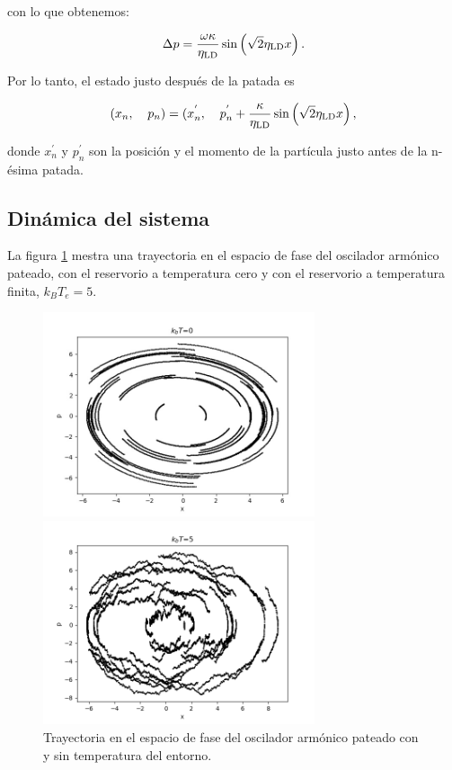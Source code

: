 \documentclass[letterpaper,12pt,oneside]{book}
\begin{document}
	\noindent con lo que obtenemos:
	
	\begin{equation}
		\Delta p = \frac{\omega\kappa}{\eta_{\rm LD}} \sin \left(\sqrt{2} \eta_{\rm LD} x \right).
	\end{equation}
	
	Por lo tanto,  el estado justo despu\'es de la patada es
	
	\begin{equation}\label{EfectoPatada}
		(x_n,\verb|  | p_n) = (x_n^{'}, \verb|  | p_n^{'} +  \frac{\kappa}{\eta_{\rm LD}} \sin \left(\sqrt{2} \eta_{\rm LD} x \right),
	\end{equation}
	
	\noindent donde $x_n^{'}$ y $p_n^{'}$ son la posici\'on y el momento de la part\'icula justo antes de la n-\'esima patada.
	
	\subsection{Din\'amica del sistema}
	
	La figura \ref{fig.Temp0vsTempFinita} mestra una trayectoria en el espacio de fase del oscilador arm\'onico pateado, con el reservorio a temperatura cero y con el reservorio a temperatura finita, $k_BT_e = 5$.
	
	\begin{figure} [h!]
		\centering 
		\begin{minipage}{0.45\textwidth}
			\centering 
			\includegraphics[width=8cm]{Figures/noT}
		\end{minipage}
		\begin{minipage}{0.45\textwidth}
			\centering 
			\includegraphics[width=8cm]{Figures/10T}
		\end{minipage}
		
		\caption{Trayectoria en el espacio de fase del oscilador armónico pateado con y sin temperatura del entorno.}
		\label{fig.Temp0vsTempFinita}
	\end{figure}
	
\end{document}
